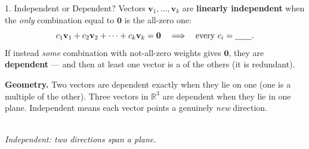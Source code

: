 \documentclass[10pt]{article}
\newcommand{\vv}{\mathbf{v}}
\newcommand{\ww}{\mathbf{w}}
\newcommand{\zero}{\mathbf{0}}
\begin{document}
\begin{notesbox}{1. Independent or Dependent?}
Vectors $\vv_1,\dots,\vv_k$ are \textbf{linearly independent} when the \emph{only} combination equal to
$\zero$ is the all-zero one:
\[
  c_1\vv_1+c_2\vv_2+\dots+c_k\vv_k=\zero \quad\Longrightarrow\quad \text{every } c_i=\blank{0.7cm}.
\]
If instead \emph{some} combination with not-all-zero weights gives $\zero$, they are \textbf{dependent} ---
and then at least one vector is a \blank{2.6cm} of the others (it is redundant).
\begin{minipage}[t]{0.60\linewidth}\vspace{3pt}
\textbf{Geometry.} Two vectors are dependent exactly when they lie on one \blank{1.4cm} (one is a multiple
of the other). Three vectors in $\mathbb{R}^3$ are dependent when they lie in one plane. Independent means
each vector points a genuinely \emph{new} direction.
\end{minipage}\hfill
\begin{minipage}[t]{0.36\linewidth}\vspace{0pt}\centering
{}\\[-2pt]
{\scriptsize\itshape Independent: two directions span a plane.}
\end{minipage}
\end{notesbox}
\end{document}
